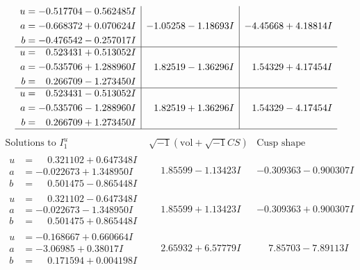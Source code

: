 \documentclass[1p]{elsarticle_modified}
\theoremstyle{definition}
\newcommand{\I}{\sqrt{-1}}
\begin{document}
$$\begin{array}{c|c|c}
\begin{aligned}
u &= -0.517704 - 0.562485 I \\
a &= -0.668372 + 0.070624 I \\
b &= -0.476542 - 0.257017 I\end{aligned}
 & -1.05258 - 1.18693 I & -4.45668 + 4.18814 I \\ \hline\begin{aligned}
u &= \phantom{-}0.523431 + 0.513052 I \\
a &= -0.535706 + 1.288960 I \\
b &= \phantom{-}0.266709 - 1.273450 I\end{aligned}
 & \phantom{-}1.82519 - 1.36296 I & \phantom{-}1.54329 + 4.17454 I \\ \hline\begin{aligned}
u &= \phantom{-}0.523431 - 0.513052 I \\
a &= -0.535706 - 1.288960 I \\
b &= \phantom{-}0.266709 + 1.273450 I\end{aligned}
 & \phantom{-}1.82519 + 1.36296 I & \phantom{-}1.54329 - 4.17454 I\\
 \hline 
 \end{array}$$\newpage$$\begin{array}{c|c|c}  
\text{Solutions to }I^u_{1}& \I (\text{vol} + \sqrt{-1}CS) & \text{Cusp shape}\\
 \hline 
\begin{aligned}
u &= \phantom{-}0.321102 + 0.647348 I \\
a &= -0.022673 + 1.348950 I \\
b &= \phantom{-}0.501475 - 0.865448 I\end{aligned}
 & \phantom{-}1.85599 - 1.13423 I & -0.309363 - 0.900307 I \\ \hline\begin{aligned}
u &= \phantom{-}0.321102 - 0.647348 I \\
a &= -0.022673 - 1.348950 I \\
b &= \phantom{-}0.501475 + 0.865448 I\end{aligned}
 & \phantom{-}1.85599 + 1.13423 I & -0.309363 + 0.900307 I \\ \hline\begin{aligned}
u &= -0.168667 + 0.660664 I \\
a &= -3.06985 + 0.38017 I \\
b &= \phantom{-}0.171594 + 0.004198 I\end{aligned}
 & \phantom{-}2.65932 + 6.57779 I & \phantom{-}7.85703 - 7.89113 I \\ \hline\begin{aligned}

\end{aligned}
\end{array}$$
\end{document}
